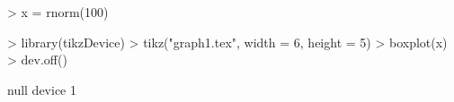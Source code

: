 \documentclass{article}
\begin{document}


\begin{Schunk}
\begin{Sinput}
> x = rnorm(100)
\end{Sinput}
\end{Schunk}

\begin{Schunk}
\begin{Sinput}
> library(tikzDevice)
> tikz("graph1.tex", width = 6, height = 5)
> boxplot(x)
> dev.off()
\end{Sinput}
\begin{Soutput}
null device 
          1 
\end{Soutput}
\end{Schunk}

\begin{figure}

\end{figure}
\end{document}
